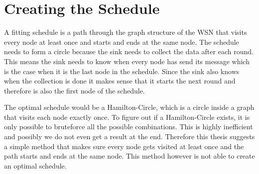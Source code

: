 \section{Creating the Schedule}
\label{chp:apr_creatingSchedule}
A fitting schedule is a path through the graph structure of the WSN that visits every node at least once and starts and ends at the same node. The schedule needs to form a circle because the sink needs to collect the data after each round. This means the sink needs to know when every node has send its message which is the case when it is the last node in the schedule. Since the sink also knows when the collection is done it makes sense that it starts the next round and therefore is also the first node of the schedule. 

The optimal schedule would be a Hamilton-Circle, which is a circle inside a graph that visits each node exactly once. To figure out if a Hamilton-Circle exists, it is only possible to bruteforce all the possible combinations. This is highly inefficient and possibly we do not even get a result at the end. Therefore this thesis suggests a simple method that makes sure every node gets visited at least once and the path starts and ends at the same node. This method however is not able to create an optimal schedule.

